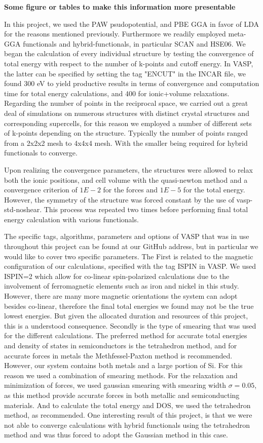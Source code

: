 \textbf{Some figure or tables to make this information more presentable}

In this project, we used the PAW psudopotential, and PBE GGA in favor of LDA for the reasons mentioned previously. Furthermore we readily employed meta-GGA functionals and hybrid-functionals, in particular SCAN and HSE06. We began the calculation of every individual structure by testing the convergence of total energy with respect to the number of k-points and cutoff energy. In VASP, the latter can be specified by setting the tag "ENCUT" in the INCAR file, we found 300 eV to yield productive results in terms of convergence and computation time for total energy calculations, and 400 for ionic+volume relaxations. Regarding the number of points in the reciprocal space, we carried out a great deal of simulations on numerous structures with distinct crystal structures and corresponding supercells, for this reason we employed a number of different sets of k-points depending on the structure. Typically the number of points ranged from a 2x2x2 mesh to 4x4x4 mesh. With the smaller being required for hybrid functionals to converge. 

Upon realizing the convergence parameters, the structures were allowed to relax both the ionic positions, and cell volume with the quasi-newton method and a convergence criterion of $1E-2$ for the forces and $1E-5$ for the total energy. However, the symmetry of the structure was forced constant by the use of vasp-std-noshear. This process was repeated two times before performing final total energy calculation with various functionals.

The specific tags, algorithms, parameters and options of VASP that was in use throughout this project can be found at our GitHub address, but in particular we would like to cover two specific parameters. The First is related to the magnetic configuration of our calculations, specified with the tag ISPIN in VASP. We used ISPIN=2 which allow for co-linear spin-polarized calculations due to the involvement of ferromagnetic elements such as iron and nickel in this study. However, there are many more magnetic orientations the system can adopt besides co-linear, therefore the final total energies we found may not be the true lowest energies. But given the allocated duration and resources of this project, this is a understood consequence. Secondly is the type of smearing that was used for the different calculations. The preferred method for accurate total energies and density of states in semiconductors is the tetrahedron method, and for accurate forces in metals the Methfessel-Paxton method is recommended. However, our system contains both metals and a large portion of Si. For this reason we used a combination of smearing methods. For the relaxation and minimization of forces, we used gaussian smearing with smearing width $\sigma = 0.05$, as this method provide accurate forces in both metallic and semiconducting materials. And to calculate the total energy and DOS, we used the tetrahedron method, as recommended. One interesting result of this project, is that we were not able to converge calculations with hybrid functionals using the tetrahedron method and was thus forced to adopt the Gaussian method in this case.


